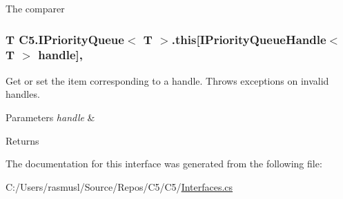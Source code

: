 The comparer\hypertarget{interface_c5_1_1_i_priority_queue_a39daad6dcf3a45c1241d4d776d18bed9}{}
\subsubsection[{this[I\+Priority\+Queue\+Handle$<$ T $>$ handle]}]{\setlength{\rightskip}{0pt plus 5cm}T {\bf C5.\+I\+Priority\+Queue}$<$ T $>$.this\mbox{[}{\bf I\+Priority\+Queue\+Handle}$<$ T $>$ handle\mbox{]}\hspace{0.3cm}{\ttfamily [get]}, {\ttfamily [set]}}\label{interface_c5_1_1_i_priority_queue_a39daad6dcf3a45c1241d4d776d18bed9}


Get or set the item corresponding to a handle. Throws exceptions on invalid handles. 


\begin{DoxyParams}{Parameters}
{\em handle} & \\
\hline
\end{DoxyParams}
\begin{DoxyReturn}{Returns}

\end{DoxyReturn}


The documentation for this interface was generated from the following file\+:\begin{DoxyCompactItemize}
\item 
C\+:/\+Users/rasmusl/\+Source/\+Repos/\+C5/\+C5/\hyperlink{_interfaces_8cs}{Interfaces.\+cs}\end{DoxyCompactItemize}
